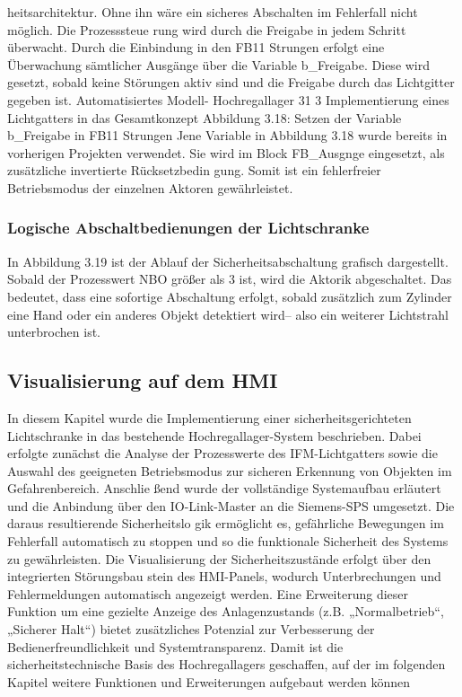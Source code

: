 heitsarchitektur.
Ohne ihn wäre ein sicheres Abschalten im Fehlerfall nicht möglich. Die Prozesssteue
rung wird durch die Freigabe in jedem Schritt überwacht.
Durch die Einbindung in den FB11 Strungen erfolgt eine Überwachung sämtlicher
Ausgänge über die Variable b\_Freigabe. Diese wird gesetzt, sobald keine Störungen
aktiv sind und die Freigabe durch das Lichtgitter gegeben ist.
Automatisiertes Modell- Hochregallager
31
3 Implementierung eines Lichtgatters in das Gesamtkonzept
Abbildung 3.18: Setzen der Variable b\_Freigabe in FB11 Strungen
Jene Variable in Abbildung 3.18 wurde bereits in vorherigen Projekten verwendet.
Sie wird im Block FB\_Ausgnge eingesetzt, als zusätzliche invertierte Rücksetzbedin
gung. Somit ist ein fehlerfreier Betriebsmodus der einzelnen Aktoren gewährleistet.


\subsubsection{Logische Abschaltbedienungen der Lichtschranke}

In Abbildung 3.19 ist der Ablauf der Sicherheitsabschaltung grafisch dargestellt. Sobald
der Prozesswert NBO größer als 3 ist, wird die Aktorik abgeschaltet. Das bedeutet,
dass eine sofortige Abschaltung erfolgt, sobald zusätzlich zum Zylinder eine Hand oder
ein anderes Objekt detektiert wird– also ein weiterer Lichtstrahl unterbrochen ist.


\subsection{Visualisierung auf dem HMI}
In diesem Kapitel wurde die Implementierung einer sicherheitsgerichteten Lichtschranke
in das bestehende Hochregallager-System beschrieben. Dabei erfolgte zunächst die
Analyse der Prozesswerte des IFM-Lichtgatters sowie die Auswahl des geeigneten
Betriebsmodus zur sicheren Erkennung von Objekten im Gefahrenbereich. Anschlie
ßend wurde der vollständige Systemaufbau erläutert und die Anbindung über den
IO-Link-Master an die Siemens-SPS umgesetzt. Die daraus resultierende Sicherheitslo
gik ermöglicht es, gefährliche Bewegungen im Fehlerfall automatisch zu stoppen und
so die funktionale Sicherheit des Systems zu gewährleisten.
Die Visualisierung der Sicherheitszustände erfolgt über den integrierten Störungsbau
stein des HMI-Panels, wodurch Unterbrechungen und Fehlermeldungen automatisch
angezeigt werden. Eine Erweiterung dieser Funktion um eine gezielte Anzeige des
Anlagenzustands (z.B. „Normalbetrieb“, „Sicherer Halt“) bietet zusätzliches Potenzial
zur Verbesserung der Bedienerfreundlichkeit und Systemtransparenz.
Damit ist die sicherheitstechnische Basis des Hochregallagers geschaffen, auf der im
folgenden Kapitel weitere Funktionen und Erweiterungen aufgebaut werden können

